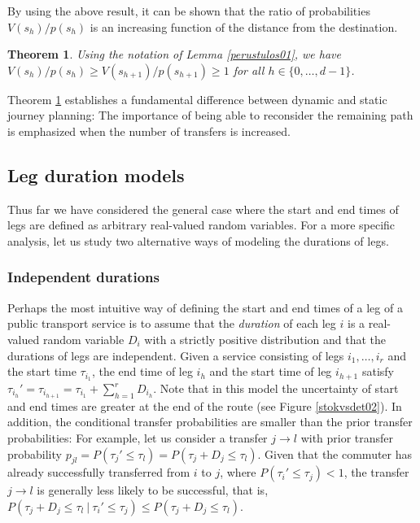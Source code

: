 \documentclass[dissertation,draft*]{aaltoseries}
\newtheorem{theorem}{Theorem}
\begin{document}
By using the above result, it can be shown that the ratio of 
probabilities $V(s_h)/p(s_h)$ is an increasing function
of the distance from the destination.
\begin{theorem}
\label{kasvavat}
Using the notation of Lemma \ref{perustulos01}, we have
$V(s_h) / p(s_h) \geq V(s_{h+1}) / p(s_{h+1}) \geq 1$ for all $h \in \{0,\ldots,d-1\}$.
\end{theorem}
Theorem \ref{kasvavat} establishes a fundamental difference between dynamic and static journey planning: 
The importance of being able to reconsider the remaining path is emphasized when the number of transfers is increased.

\subsection{Leg duration models}
\label{durationmodels}
Thus far we have considered the general case where the start and end times of legs
are defined as arbitrary real-valued random variables. 
For a more specific analysis, let us study two alternative ways of modeling the durations of legs.

\subsubsection{Independent durations}
\label{independentdurations}
Perhaps the most intuitive way of defining the start and end times of a leg of a public transport service
is to assume that the \emph{duration} of each leg $i$ is a real-valued random variable $D_i$
with a strictly positive distribution and that the durations of legs are independent.
Given a service consisting of legs $i_1,\ldots,i_r$ and the start time $\tau_{i_1}$, the end time of leg $i_h$
and the start time of leg $i_{h+1}$ satisfy $\tau_{i_h}' = \tau_{i_{h+1}} = \tau_{i_1} + \sum_{h=1}^r D_{i_h}$.
Note that in this model the uncertainty of start and end times are greater at
the end of the route (see Figure \ref{stokvsdet02}). In addition, the conditional transfer probabilities 
are smaller than the prior transfer probabilities: For example, let us consider a 
transfer $j \to l$ with prior transfer probability $p_{jl} = P(\tau_j' \leq \tau_l)=P(\tau_j + D_j \leq \tau_l)$.
Given that the commuter has already successfully transferred from $i$ to $j$, where $P(\tau_i' \leq \tau_j) < 1$,
the transfer $j \to l$ is generally less likely to be successful, that is, 
$P(\tau_j + D_j \leq \tau_l \ | \ \tau_i' \leq \tau_j) \leq P(\tau_j + D_j \leq \tau_l)$.
\end{document}
